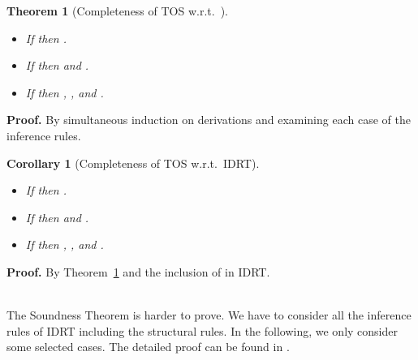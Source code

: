 \documentclass[submission,copyright,creativecommons]{eptcs}
\newtheorem{theorem}[definition]{Theorem}
\newtheorem{cor}[definition]{Corollary}
\newcommand{\wrt}{{w.r.t.}}
\begin{document}
\begin{theorem}[Completeness of TOS \wrt\ ] \label{compl}\
\begin{itemize}
  \item If  then .
  \item If  then  and .
  \item If  then , ,  and .
\end{itemize}
\end{theorem}
\textbf{Proof.} By simultaneous induction on derivations and examining each case of the  inference rules.


\begin{cor}[Completeness of TOS \wrt\ IDRT] \label{completeness}\
\begin{itemize}
  \item If  then .
  \item If  then  and .
  \item If  then , ,  and .
\end{itemize}
\end{cor}
\textbf{Proof.} By Theorem~\ref{compl} and the inclusion of  in IDRT.

\ \\

The Soundness Theorem is harder to prove.  We have to consider all the inference rules of IDRT including the structural rules.   In the following, we only consider some selected cases.  The detailed proof can be found in \cite{Fen10}.
\end{document}
